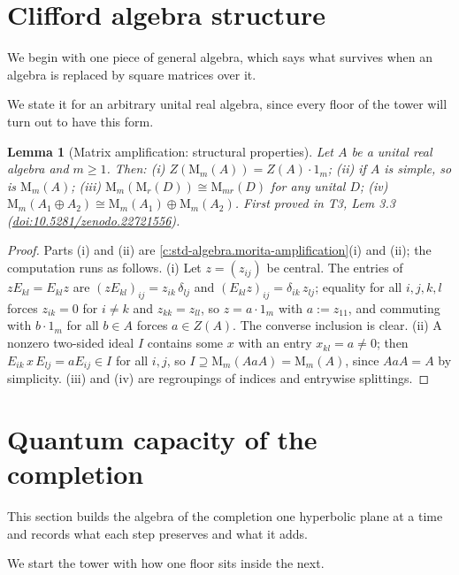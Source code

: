 \documentclass[11pt]{article}
\newtheorem{lemma}[theorem]{Lemma}
\theoremstyle{definition}
\theoremstyle{plain}
\providecommand{\Mat}{}\renewcommand{\Mat}{\mathrm{M}}
\begin{document}
\section{Clifford algebra structure}

We begin with one piece of general algebra, which says what survives when an algebra is replaced by square matrices over it.

We state it for an arbitrary unital real algebra, since every floor of the tower will turn out to have this form.

\begin{lemma}[Matrix amplification: structural properties]\label{c:tower.matrix-amplification-structural-properties}
Let $A$ be a unital real algebra and $m \geq 1$. Then: (i) $Z(\Mat_m(A)) = Z(A)\cdot 1_m$; (ii) if $A$ is simple, so is $\Mat_m(A)$; (iii) $\Mat_m(\Mat_r(D)) \cong \Mat_{mr}(D)$ for any unital $D$; (iv) $\Mat_m(A_1 \oplus A_2) \cong \Mat_m(A_1) \oplus \Mat_m(A_2)$.
\emph{First proved in} T3, Lem 3.3 (\href{https://doi.org/10.5281/zenodo.22721556}{doi:10.5281/zenodo.22721556}).
\end{lemma}
\begin{proof}
Parts (i) and (ii) are \ref{c:std-algebra.morita-amplification}(i) and (ii); the computation runs as follows. (i) Let $z = (z_{ij})$ be central. The entries of $z E_{kl} = E_{kl} z$ are $(z E_{kl})_{ij} = z_{ik}\,\delta_{lj}$ and $(E_{kl} z)_{ij} = \delta_{ik}\, z_{lj}$; equality for all $i, j, k, l$ forces $z_{ik} = 0$ for $i \neq k$ and $z_{kk} = z_{ll}$, so $z = a \cdot 1_m$ with $a := z_{11}$, and commuting with $b \cdot 1_m$ for all $b \in A$ forces $a \in Z(A)$. The converse inclusion is clear. (ii) A nonzero two-sided ideal $I$ contains some $x$ with an entry $x_{kl} = a \neq 0$; then $E_{ik}\, x\, E_{lj} = a E_{ij} \in I$ for all $i, j$, so $I \supseteq \Mat_m(AaA) = \Mat_m(A)$, since $AaA = A$ by simplicity. (iii) and (iv) are regroupings of indices and entrywise splittings.

\end{proof}

\section{Quantum capacity of the completion}

This section builds the algebra of the completion one hyperbolic plane at a time and records what each step preserves and what it adds.

We start the tower with how one floor sits inside the next.
\end{document}
